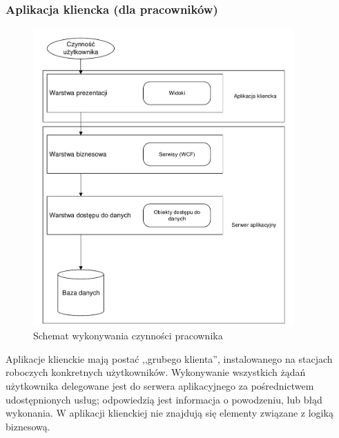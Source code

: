 \documentclass[10pt,a4paper]{article}
\begin{document}
\subsubsection{Aplikacja kliencka (dla pracowników)}
\begin{figure}[H]
	\centering
	\includegraphics[width=10cm]{Resources/PDF/architecture-fat-client.pdf}
	\caption{Schemat wykonywania czynności pracownika}
\end{figure}
Aplikacje klienckie mają postać ,,grubego klienta'', instalowanego na stacjach roboczych konkretnych użytkowników. Wykonywanie wszystkich żądań użytkownika delegowane jest do serwera aplikacyjnego za pośrednictwem udostępnionych usług; odpowiedzią jest informacja o powodzeniu, lub błąd wykonania. W aplikacji klienckiej nie znajdują się elementy związane z logiką biznesową.
\end{document}
